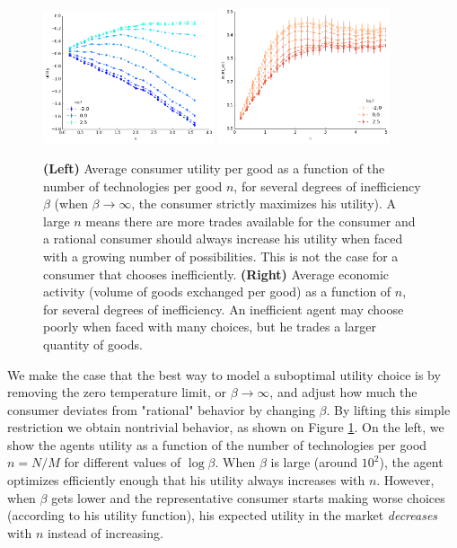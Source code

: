 \begin{figure}[!ht]
  \centering
  \includegraphics[width=0.45\textwidth]{figs_inef/utility.png}
  \includegraphics[width=0.45\textwidth]{figs_inef/econ_act.png}
  \caption{\textbf{(Left)} Average consumer utility per good as a function of the number of technologies per good $n$, for several degrees of inefficiency $\beta$ (when $\beta \to \infty$, the consumer strictly maximizes his utility). A large $n$ means there are more trades available for the consumer and a rational consumer should always increase his utility when faced with a growing number of possibilities. This is not the case for a consumer that chooses inefficiently. \textbf{(Right)} Average economic activity (volume of goods exchanged per good) as a function of $n$, for several degrees of inefficiency. An inefficient agent may choose poorly when faced with many choices, but he trades a larger quantity of goods.}
  \label{fig:intro_inef}
\end{figure}

We make the case that the best way to model a suboptimal utility choice is by removing the zero temperature limit, or $\beta \to \infty$, and adjust how much the consumer deviates from "rational" behavior by changing $\beta$. By lifting this simple restriction we  obtain nontrivial behavior, as shown on Figure \ref{fig:intro_inef}. On the left, we show the agents utility as a function of the number of technologies per good $n = N/ M$ for different values of $\log \beta$. When $\beta$ is large (around $10^2$), the agent optimizes efficiently enough that his utility always increases with $n$. However, when $\beta$ gets lower and the representative consumer starts making worse choices (according to his utility function), his expected utility in the market \textit{decreases} with $n$ instead of increasing.

